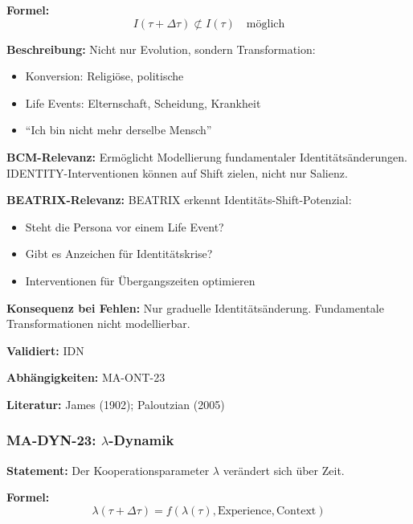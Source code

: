 \textbf{Formel:}
\begin{equation}
I(\tau + \Delta\tau) \not\subset I(\tau) \quad \text{möglich}
\end{equation}

\textbf{Beschreibung:}
Nicht nur Evolution, sondern Transformation:
\begin{itemize}
    \item Konversion: Religiöse, politische
    \item Life Events: Elternschaft, Scheidung, Krankheit
    \item ``Ich bin nicht mehr derselbe Mensch''
\end{itemize}

\textbf{BCM-Relevanz:}
Ermöglicht Modellierung fundamentaler Identitätsänderungen. IDENTITY-Interventionen können auf Shift zielen, nicht nur Salienz.

\textbf{BEATRIX-Relevanz:}
BEATRIX erkennt Identitäts-Shift-Potenzial:
\begin{itemize}
    \item Steht die Persona vor einem Life Event?
    \item Gibt es Anzeichen für Identitätskrise?
    \item Interventionen für Übergangszeiten optimieren
\end{itemize}

\textbf{Konsequenz bei Fehlen:}
Nur graduelle Identitätsänderung. Fundamentale Transformationen nicht modellierbar.

\textbf{Validiert:} IDN

\textbf{Abhängigkeiten:} MA-ONT-23

\textbf{Literatur:} James (1902); Paloutzian (2005)


\subsubsection*{MA-DYN-23: $\lambda$-Dynamik}

\textbf{Statement:} Der Kooperationsparameter $\lambda$ verändert sich über Zeit.

\textbf{Formel:}
\begin{equation}
\lambda(\tau + \Delta\tau) = f(\lambda(\tau), \text{Experience}, \text{Context})
\end{equation}

